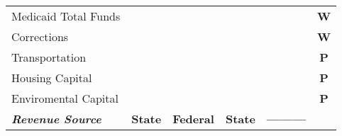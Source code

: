 \begin{table}[htbp]
\begin{tabular}{|l|c|c|c|c|r|}
        \cline{2-6}    \multicolumn{1}{|p{9.93em}|}{Medicaid Total Funds}                    &                                             &                                            &                                             &                                          & \multicolumn{1}{c|}{\textbf{W}}                                      \\
        \cline{2-6}    \multicolumn{1}{|p{9.93em}|}{Corrections }                            &                                             &                                            &                                             &                                          & \multicolumn{1}{c|}{\textbf{W}}                                      \\
        \cline{2-6}    \multicolumn{1}{|p{9.93em}|}{Transportation }                         &                                             &                                            &                                             &                                          & \multicolumn{1}{c|}{\textbf{P}}                                      \\
        \cline{2-6}    \multicolumn{1}{|p{9.93em}|}{Housing Capital }                        &                                             &                                            &                                             &                                          & \multicolumn{1}{c|}{\textbf{P}}                                      \\
        \cline{2-6}    \multicolumn{1}{|p{9.93em}|}{Enviromental Capital }                   &                                             &                                            &                                             &                                          & \multicolumn{1}{c|}{\textbf{P}}                                      \\
        \hline
        \textit{\textbf{Revenue Source}}                                                     & \textbf{State}                              & \textbf{Federal}                           & \textbf{State}                              & \textbf{---------}                       &                                                                      \\
        \hline
    \end{tabular}%
    \label{expenditure}%
\end{table}%

\clearpage

